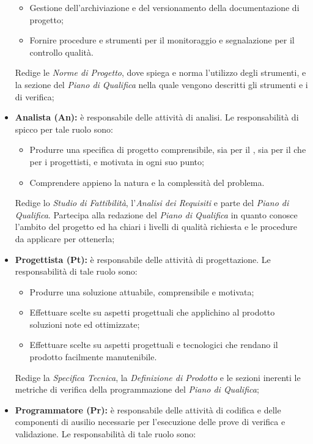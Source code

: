 \begin{itemize}
\begin{itemize}
				\item Gestione dell'archiviazione e del versionamento della documentazione di progetto;
				\item Fornire procedure e strumenti per il monitoraggio e segnalazione per il controllo
qualità. \\
			\end{itemize}
			Redige le \textit{Norme di Progetto}, dove spiega e norma l'utilizzo degli strumenti, e la sezione del \textit{Piano di Qualifica} nella quale vengono descritti gli strumenti e i  di verifica;
			\item \textbf{Analista (An):} è responsabile delle attività di analisi. Le responsabilità di spicco per tale ruolo sono: \\
			\begin{itemize}
				\item Produrre una specifica di progetto comprensibile, sia per il , sia per il  che per i progettisti, e motivata in ogni suo punto;
				\item  Comprendere appieno la natura e la complessità del problema. \\
			\end{itemize}
			Redige lo \textit{Studio di Fattibilità}, l'\textit{Analisi dei Requisiti} e parte del \textit{Piano di Qualifica}. Partecipa alla redazione del \textit{Piano di Qualifica} in quanto conosce l'ambito del progetto ed ha chiari i livelli di qualità richiesta e le procedure da applicare per ottenerla;
			\item \textbf{Progettista (Pt):} è responsabile delle attività di progettazione.
Le responsabilità di tale ruolo sono: \\
			\begin{itemize}
				\item Produrre una soluzione attuabile, comprensibile e motivata;
				\item Effettuare scelte su aspetti progettuali che applichino al prodotto soluzioni
note ed ottimizzate;
				\item Effettuare scelte su aspetti progettuali e tecnologici che rendano il prodotto
facilmente manutenibile. \\
			\end{itemize}
			Redige la \textit{Specifica Tecnica}, la \textit{Definizione di Prodotto} e le sezioni inerenti le metriche di verifica della programmazione del \textit{Piano di Qualifica};
			\item \textbf{Programmatore (Pr):} è responsabile delle attività di codifica e delle componenti di ausilio necessarie per l'esecuzione delle prove di verifica e validazione. Le responsabilità di tale ruolo sono: \\

\end{itemize}
